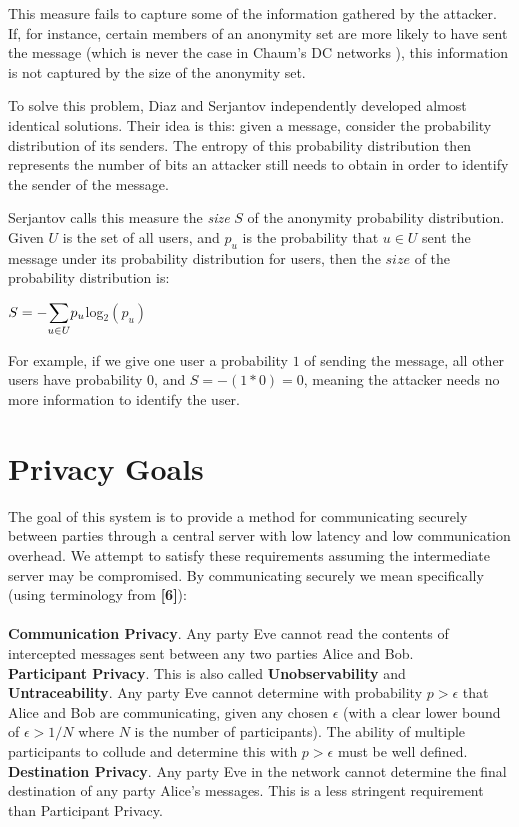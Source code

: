 \documentclass[twocolumn]{paper}
\begin{document}
This measure fails to capture some of the information gathered by the attacker. If, for instance, certain members of an anonymity set are more likely to have sent the message (which is never the case in Chaum's DC networks \cite{chaum-dc}), this information is not captured by the size of the anonymity set. 

To solve this problem, Diaz \cite{Diaz02} and Serjantov \cite{Serj02} independently developed almost identical solutions. Their idea is this: given a message, consider the probability distribution of its senders. The entropy of this probability distribution then represents the number of bits an attacker still needs to obtain in order to identify the sender of the message. 

Serjantov \cite{Serj02} calls this measure the \textit{size} $S$ of the anonymity probability distribution. Given $U$ is the set of all users, and $p_u$ is the probability that $u \in U$ sent the message under its probability distribution for users, then the $size$ of the probability distribution is:

\begin{center}
$ S = - \mathlarger{\sum}\limits_{u \in U} p_u $log$_2(p_u)$
\end{center}

For example, if we give one user a probability $1$ of sending the message, all other users have probability 0, and $S = -(1 * 0) = 0$, meaning the attacker needs no more information to identify the user. 



\section{Privacy Goals}
  The goal of this system is to provide a method for communicating securely between parties through a central server with low latency and low communication overhead. We attempt to satisfy these requirements assuming the intermediate server may be compromised. By communicating securely we mean specifically (using terminology from \textbf{[6]}):
  \\\\\textbf{Communication Privacy}. Any party Eve cannot read the contents of intercepted messages sent between any two parties Alice and Bob. 
  \\\textbf{Participant Privacy}. This is also called \textbf{Unobservability} and \textbf{Untraceability}. Any party Eve cannot determine with probability $p > \epsilon$ that Alice and Bob are communicating, given any chosen $\epsilon$ (with a clear lower bound of $\epsilon > 1/N$ where $N$ is the number of participants). The ability of multiple participants to collude and determine this with $p > \epsilon$ must be well defined.
  \\\textbf{Destination Privacy}. Any party Eve in the network cannot determine the final destination of any party Alice's messages. This is a less stringent requirement than Participant Privacy.
\end{document}
